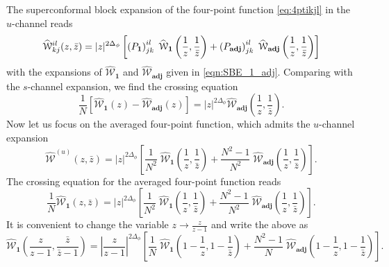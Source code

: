 \documentclass[11pt]{article}
\newcommand{\zb}{\bar{z}}
\begin{document}
The superconformal block expansion of the four-point function \eqref{eq:4ptikjl} in the $u$-channel reads
%
\begin{equation}\label{eqn:Wikjldecompose_u-channel}
\widehat{\mathcal{W}}^{il}_{kj}(z,\zb)
  = |z|^{2\Delta_\phi}\left[ \left(P_\mathbf{1}\right)^{il}_{jk} \;  \widehat{\mathcal{W}}_\mathbf{1}\left( \frac{1}{z},\frac{1}{\zb}\right) + \left(P_{\bf adj}\right)^{il}_{jk} \; \widehat{\mathcal{W}}_\mathbf{adj} \left( \frac{1}{z},\frac{1}{\zb}\right)\right]
\end{equation}
%
with the expansions of $\widehat{\mathcal{W}}_\mathbf{1}$ and $\widehat{\mathcal{W}}_\mathbf{adj}$ given in \eqref{eqn:SBE_1_adj}. Comparing with the $s$-channel expansion, we find the crossing equation
%
\begin{equation}
\frac{1}{N}\left[\widehat{\mathcal{W}}_\mathbf{1}(z)-\widehat{\mathcal{W}}_\mathbf{adj}(z)\right] = |z|^{2\Delta_{\phi}}\widehat{\mathcal{W}}_\mathbf{adj}\left( \frac{1}{z},\frac{1}{\zb}\right).
\end{equation}
%
Now let us focus on the averaged four-point function, which admits the $u$-channel expansion 
%
\begin{equation}
\widehat{\mathcal{W}}^{(u)}(z,\zb) =|z|^{2\Delta_\phi}\left[ \frac{1}{N^{2}} \;  \widehat{\mathcal{W}}_\mathbf{1}\left( \frac{1}{z},\frac{1}{\zb}\right) +  \frac{N^2-1}{N^2}  \; \widehat{\mathcal{W}}_\mathbf{adj} \left( \frac{1}{z},\frac{1}{\zb}\right)\right] .
\end{equation}
%
The crossing equation for the averaged four-point function reads
%
\begin{equation}
\frac{1}{ N}\widehat{\mathcal{W}}_\mathbf{1}(z,\zb) =|z|^{2\Delta_\phi}\left[ \frac{1}{N^{2}} \;  \widehat{\mathcal{W}}_\mathbf{1}\left( \frac{1}{z},\frac{1}{\zb}\right) +  \frac{N^2-1}{N^2}  \; \widehat{\mathcal{W}}_\mathbf{adj} \left( \frac{1}{z},\frac{1}{\zb}\right)\right] .
\end{equation}
%
It is convenient to change the variable $z\to \frac{z}{z-1}$ and write the above as
%
\begin{equation}
\widehat{\mathcal{W}}_\mathbf{1}\left(\frac{z}{z-1},\frac{\zb}{\zb-1}\right) =\left|\frac{z}{z-1}\right|^{2\Delta_\phi}\left[ \frac{1}{N} \;  \widehat{\mathcal{W}}_\mathbf{1}\left(1- \frac{1}{z},1-\frac{1}{\zb}\right) +  \frac{N^2-1}{N}  \; \widehat{\mathcal{W}}_\mathbf{adj} \left(1- \frac{1}{z},1-\frac{1}{\zb}\right)\right]  .
\end{equation}
%
\end{document}
